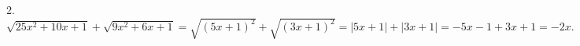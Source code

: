 2. $\sqrt{25x^2+10x+1}+\sqrt{9x^2+6x+1}=\sqrt{(5x+1)^2}+\sqrt{(3x+1)^2}=|5x+1|+|3x+1|=-5x-1+3x+1=-2x.$\\
